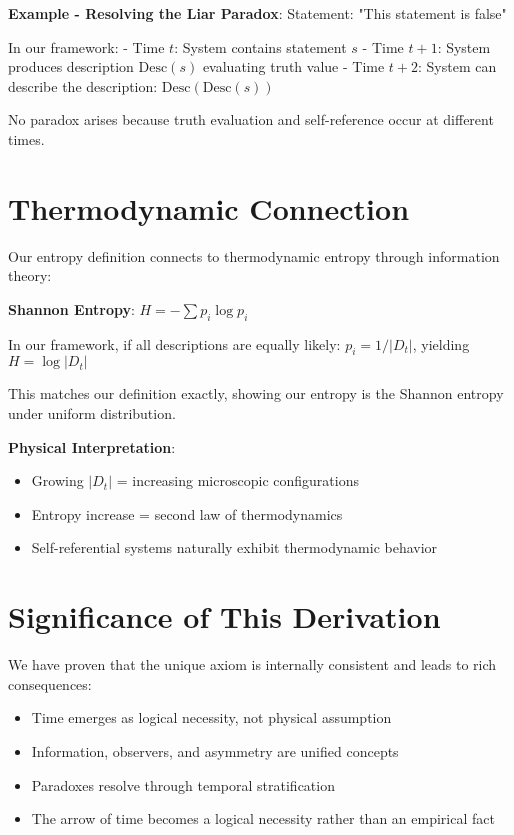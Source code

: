 \textbf{Example - Resolving the Liar Paradox}:
Statement: "This statement is false"

In our framework:
- Time $t$: System contains statement $s$
- Time $t+1$: System produces description $\text{Desc}(s)$ evaluating truth value
- Time $t+2$: System can describe the description: $\text{Desc}(\text{Desc}(s))$

No paradox arises because truth evaluation and self-reference occur at different times.

\section{Thermodynamic Connection}
\label{sec:ch01_axiom_and_derivation:thermodynamic-connection}

Our entropy definition connects to thermodynamic entropy through information theory:

\textbf{Shannon Entropy}: $H = -\sum p_i \log p_i$

In our framework, if all descriptions are equally likely:
$p_i = 1/|D_t|$, yielding $H = \log |D_t|$

This matches our definition exactly, showing our entropy is the Shannon entropy under uniform distribution.

\textbf{Physical Interpretation}:
\begin{itemize}
\item Growing $|D_t|$ = increasing microscopic configurations
\item Entropy increase = second law of thermodynamics
\item Self-referential systems naturally exhibit thermodynamic behavior
\end{itemize}

\section{Significance of This Derivation}
\label{sec:ch01_axiom_and_derivation:significance-of-this-derivation}

We have proven that the unique axiom is internally consistent and leads to rich consequences:

\begin{itemize}
\item Time emerges as logical necessity, not physical assumption
\item Information, observers, and asymmetry are unified concepts
\item Paradoxes resolve through temporal stratification
\item The arrow of time becomes a logical necessity rather than an empirical fact
\end{itemize}

